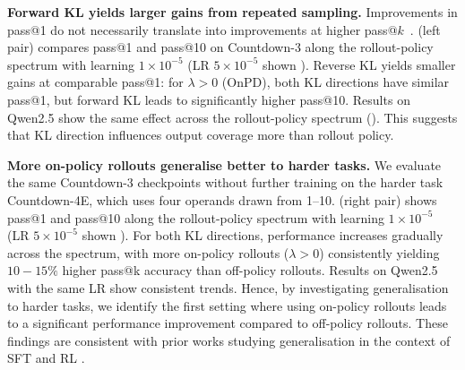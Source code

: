 \documentclass{article} %
\theoremstyle{plain}
\theoremstyle{definition}
\theoremstyle{remark}
\begin{document}

\textbf{Forward KL yields larger gains from repeated sampling.} Improvements in pass@1 do not necessarily translate into improvements at higher pass@$k$~\citep{yue2025does}.  (left pair) compares pass@1 and pass@10 on Countdown-3 along the rollout-policy spectrum with learning $1\times10^{-5}$ (LR $5\times10^{-5}$ shown ). Reverse KL yields smaller gains at comparable pass@1: for $\lambda>0$ (OnPD), both KL directions have similar pass@1, but forward KL leads to significantly higher pass@10. Results on Qwen2.5 show the same effect across the rollout-policy spectrum (). This suggests that KL direction influences output coverage more than rollout policy.

\textbf{More on-policy rollouts generalise better to harder tasks.} We evaluate the same Countdown-3 checkpoints without further training on the harder task Countdown-4E, which uses four operands drawn from 1--10.  (right pair) shows pass@1 and pass@10 along the rollout-policy spectrum with learning $1\times10^{-5}$ (LR $5\times10^{-5}$ shown ). For both KL directions, performance increases gradually across the spectrum, with more on-policy rollouts ($\lambda > 0$) consistently yielding $10-15\%$ higher pass@k accuracy than off-policy rollouts. Results on Qwen2.5 with the same LR show consistent trends. Hence, by investigating generalisation to harder tasks, we identify the first setting where using on-policy rollouts leads to a significant performance improvement compared to off-policy rollouts. These findings are consistent with prior works studying generalisation in the context of SFT and RL \citep{yuan2026f, zhang_towards_2026, ming_one-token_2026}.
\end{document}
